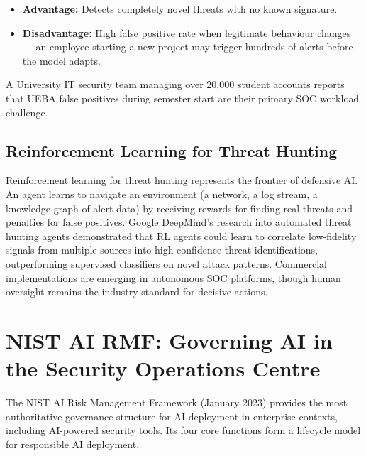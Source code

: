 \documentclass[12pt,a4paper]{article}
\begin{document}
\begin{itemize}
    \item \textbf{Advantage:} Detects completely novel threats with no known signature.
    \item \textbf{Disadvantage:} High false positive rate when legitimate behaviour changes --- an employee starting a new project may trigger hundreds of alerts before the model adapts.
\end{itemize}

\begin{example}
A University IT security team managing over 20,000 student accounts reports that UEBA false positives during semester start are their primary SOC workload challenge.
\end{example}

\subsection{Reinforcement Learning for Threat Hunting}
Reinforcement learning for threat hunting represents the frontier of defensive AI. An agent learns to navigate an environment (a network, a log stream, a knowledge graph of alert data) by receiving rewards for finding real threats and penalties for false positives. Google DeepMind's research into automated threat hunting agents demonstrated that RL agents could learn to correlate low-fidelity signals from multiple sources into high-confidence threat identifications, outperforming supervised classifiers on novel attack patterns. Commercial implementations are emerging in autonomous SOC platforms, though human oversight remains the industry standard for decisive actions.

\section{NIST AI RMF: Governing AI in the Security Operations Centre}

The NIST AI Risk Management Framework (January 2023) provides the most authoritative governance structure for AI deployment in enterprise contexts, including AI-powered security tools. Its four core functions form a lifecycle model for responsible AI deployment.
\end{document}
